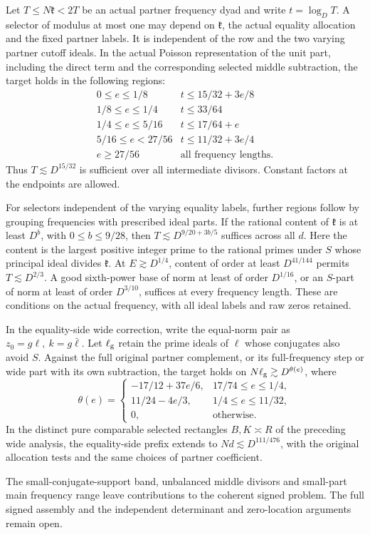\begin{theorem}\label{pca:joint-modes}
Let \(T\le N\mathfrak k<2T\) be an actual partner frequency
dyad and write \(t=\log_D T\). A selector of modulus at most one may depend
on \(\mathfrak k\), the actual equality allocation and the fixed
partner labels. It is independent of the row and the two varying
partner cutoff ideals. In the actual Poisson representation of the
unit part, including the direct term and the corresponding selected
middle subtraction, the target holds in the following regions:
\begin{equation}\label{pca:joint-frequency-frontier}
\begin{array}{c|l}
0\le e\le1/8 & t\le15/32+3e/8\\
1/8\le e\le1/4 & t\le33/64\\
1/4\le e\le5/16 & t\le17/64+e\\
5/16\le e<27/56 & t\le11/32+3e/4\\
e\ge27/56 & \text{all frequency lengths.}
\end{array}
\end{equation}
Thus \(T\lesssim D^{15/32}\) is sufficient over all intermediate
divisors. Constant factors at the endpoints are allowed.
\end{theorem}

For selectors independent of the varying equality labels, further
regions follow by grouping frequencies with prescribed ideal parts.
If the rational content of \(\mathfrak k\) is at least \(D^b\),
with \(0\le b\le9/28\), then \(T\lesssim D^{9/20+3b/5}\)
suffices across all \(d\). Here the content is the largest positive
integer prime to the rational primes under \(S\) whose principal
ideal divides \(\mathfrak k\). At \(E\gtrsim D^{1/4}\),
content of order at least \(D^{41/144}\) permits \(T\lesssim D^{2/3}\).
A good sixth-power base of norm at least of order \(D^{1/16}\),
or an \(S\)-part of norm at least of order \(D^{3/10}\),
suffices at every frequency length. These are conditions on
the actual frequency, with all ideal labels and raw zeros retained.

\begin{theorem}\label{pca:joint-eqwide}
In the equality-side wide correction, write the equal-norm pair
as \(z_0=g\ell,\ k=g\bar\ell\). Let \(\ell_{\rm g}\) retain the
prime ideals of \(\ell\) whose conjugates also avoid \(S\).
Against the full original partner complement, or its full-frequency
step or wide part with its own subtraction, the target holds on
\(N\ell_{\rm g}\gtrsim D^{\theta(e)}\), where
\[
 \theta(e)=\begin{cases}
 -17/12+37e/6,&17/74\le e\le1/4,\\
 11/24-4e/3,&1/4\le e\le11/32,\\
 0,&\text{otherwise.}
 \end{cases}
\]
In the distinct pure comparable selected rectangles \(B,K\asymp R\)
of the preceding wide analysis, the equality-side prefix extends
to \(Nd\lesssim D^{111/476}\), with the original allocation tests
and the same choices of partner coefficient.
\end{theorem}

The small-conjugate-support band, unbalanced middle divisors and
small-part main frequency range leave contributions to the coherent
signed problem. The full signed assembly and the independent
determinant and zero-location arguments remain open.
